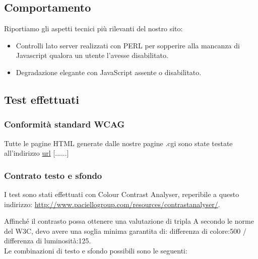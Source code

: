 \documentclass[12pt]{article}
\begin{document}
	

	\subsection{Comportamento}
	Riportiamo gli aspetti tecnici più rilevanti del nostro sito:
	
	\begin{itemize}
	\item Controlli lato server realizzati con PERL per sopperire alla mancanza di Javascript qualora un utente l'avesse disabilitato.
	\item Degradazione elegante con JavaScript assente o disabilitato.
	\end{itemize}

	\newpage
	
	\subsection{Test effettuati}
		\subsubsection{Conformità standard WCAG}
		
		Tutte le pagine HTML generate dalle nostre pagine .cgi sono state testate all'indirizzo \url{url} [......]
		\subsubsection{Contrato testo e sfondo}
		
		I test sono stati effettuati con Colour Contrast Analyser, reperibile a questo indirizzo: \url{http://www.paciellogroup.com/resources/contrastanalyser/}.\medskip
		
Affinché il contrasto possa ottenere una valutazione di tripla A secondo le norme del W3C, devo avere una soglia minima garantita di: differenza di colore:500 / differenza di luminosità:125.\\
Le combinazioni di testo e sfondo possibili sono le seguenti:
\end{document}
